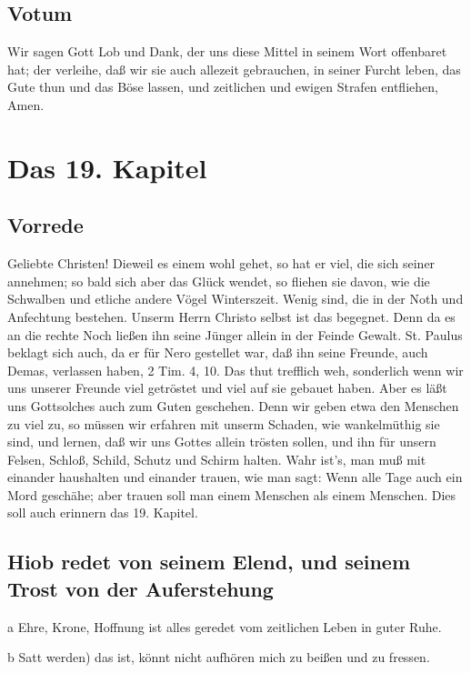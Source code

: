 \section{Votum}

Wir sagen Gott Lob und Dank, der uns diese Mittel in seinem Wort offenbaret hat; der verleihe, daß wir sie auch allezeit gebrauchen, in seiner Furcht leben, das Gute thun und das Böse lassen, und zeitlichen und ewigen Strafen entfliehen, Amen.

\chapter{Das 19. Kapitel}

\section{Vorrede}

Geliebte Christen! Dieweil es einem wohl gehet, so hat er viel, die sich seiner annehmen; so bald sich aber das Glück wendet, so fliehen sie davon, wie die Schwalben und etliche andere Vögel Winterszeit. Wenig sind, die in der Noth und Anfechtung bestehen. Unserm Herrn Christo selbst ist das begegnet. Denn da es an die rechte
Noch ließen ihn seine Jünger allein in der Feinde Gewalt. St. Paulus beklagt sich auch, da er für Nero gestellet war, daß ihn seine Freunde, auch Demas, verlassen haben, 2 Tim. 4, 10. Das thut trefflich weh, sonderlich wenn wir uns unserer Freunde viel getröstet und viel auf sie gebauet haben. Aber es läßt uns Gottsolches auch zum Guten geschehen. Denn wir geben etwa den Menschen zu viel zu, so müssen wir erfahren mit unserm Schaden, wie wankelmüthig sie sind, und lernen, daß wir uns Gottes allein trösten sollen, und ihn für unsern Felsen, Schloß, Schild, Schutz und Schirm halten. Wahr ist’s, man muß mit einander haushalten und einander trauen, wie man sagt: Wenn alle Tage auch ein Mord geschähe; aber trauen soll man einem Menschen als einem Menschen. Dies soll auch erinnern das 19. Kapitel.

\section[Hiob redet von seinem Elend, und seinem Trost]{Hiob redet von seinem Elend, und seinem Trost von der Auferstehung}

a Ehre, Krone, Hoffnung ist alles geredet vom zeitlichen Leben in guter Ruhe.

b Satt werden) das ist, könnt nicht aufhören mich zu beißen und zu fressen.

